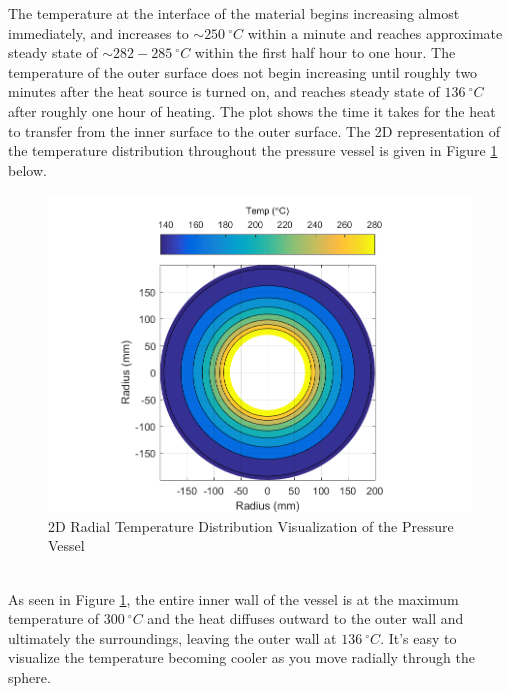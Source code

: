 \documentclass[times]{nmeauth}
\begin{document}
The temperature at the interface of the material begins increasing almost immediately, and increases to $\sim250~ ^{\circ}{C}$ within a minute and reaches approximate steady state of $\sim282-285~ ^{\circ}{C}$ within the first half hour to one hour. The temperature of the outer surface does not begin increasing until roughly two minutes after the heat source is turned on, and reaches steady state of $136~^{\circ}{C}$ after roughly one hour of heating. The plot shows the time it takes for the heat to transfer from the inner surface to the outer surface. 
\pagebreak
The 2D representation of the temperature distribution throughout the pressure vessel is given in Figure \ref{fig:3} below. 
\begin{figure}[!htbp]
\centering \includegraphics[width=125mm]{2D_TempDistribution}
\caption{2D Radial Temperature Distribution Visualization of the Pressure Vessel}\label{fig:3}
\end{figure}\\
As seen in Figure \ref{fig:3}, the entire inner wall of the vessel is at the maximum temperature of $300~^{\circ}{C}$ and the heat diffuses outward to the outer wall and ultimately the surroundings, leaving the outer wall at $136~^{\circ}{C}$. It's easy to visualize the temperature becoming cooler as you move radially through the sphere. 
\end{document}
